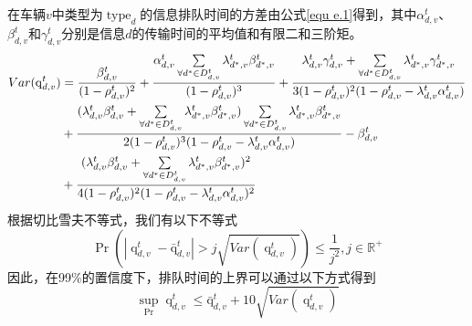 在车辆$v$中类型为$\operatorname{type}_d$的信息排队时间的方差由公式\ref{equ e.1}得到，其中$\alpha_{d, v}^t$、$\beta_{d, v}^t$和$\gamma_{d, v}^t$分别是信息$d$的传输时间的平均值和有限二和三阶矩。
\begin{align}
	{Var}(\operatorname{q}_{d, v}^t) &= \frac{\beta_{d, v}^t}{(1- \rho_{d, v}^{t})^2} + \frac{\alpha_{d, v}^t \sum\limits_{\forall d^* \in D_{d, v}^t} \lambda_{d^*, v}^t \beta_{d^*, v}^t}{(1- \rho_{d, v}^{t})^3} + \frac{\lambda_{d, v}^{t} \gamma_{d, v}^t + \sum\limits_{\forall d^* \in D_{d, v}^t} \lambda_{d^*, v}^t \gamma_{d^*, v}^t}{3(1- \rho_{d, v}^{t})^2(1-\rho_{d, v}^{t} - \lambda_{d, v}^{t}  \alpha_{d, v}^t)} \notag \\ 
	& + \frac{(\lambda_{d, v}^{t} \beta_{d, v}^t + \sum\limits_{\forall d^* \in D_{d, v}^t} \lambda_{d^*, v}^t \beta_{d^*, v}^t) \sum\limits_{\forall d^* \in D_{d, v}^t} \lambda_{d^*, v}^t \beta_{d^*, v}^t }{2(1- \rho_{d, v}^{t})^3(1-\rho_{d, v}^{t} - \lambda_{d, v}^{t}  \alpha_{d, v}^t)} - \beta_{d, v}^t \notag \\
	& + \frac{(\lambda_{d, v}^{t} \beta_{d, v}^t + \sum\limits_{\forall d^* \in D_{d, v}^t} \lambda_{d^*, v}^t \beta_{d^*, v}^t)^2}{4(1- \rho_{d, v}^{t})^2(1-\rho_{d, v}^{t} - \lambda_{d, v}^{t}  \alpha_{d, v}^t)^2}
\label{equ e.1}
\end{align}
根据切比雪夫不等式，我们有以下不等式
\begin{equation}
	\operatorname{Pr}(|\operatorname{q}_{d, v}^t - \operatorname{\bar{q}}_{d, v}^t| > j \sqrt{{Var}(\operatorname{q}_{d, v}^t)}) \leq \frac{1}{j^2}, j \in \mathbb{R}^{+}
\end{equation}
因此，在99\%的置信度下，排队时间的上界可以通过以下方式得到
\begin{equation}
	\sup_{\operatorname{Pr}}{\operatorname{q}_{d, v}^t} \leq \operatorname{\bar{q}}_{d, v}^t + 10  \sqrt{{Var}(\operatorname{q}_{d, v}^t)}
\end{equation}

